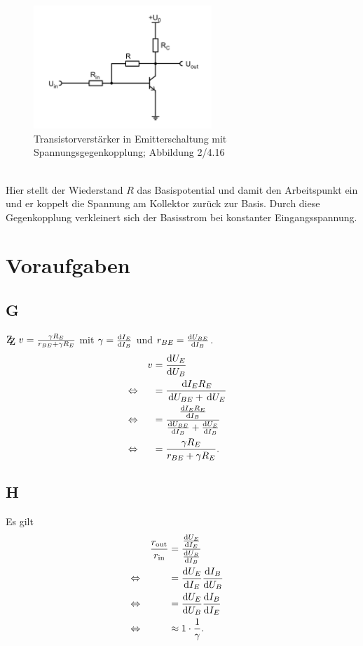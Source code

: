 \documentclass[a4paper,10pt]{article}
\newcommand{\td}{\,\text{d}}
\newcommand{\zz}{\mathrm{Z\kern-.3em\raise-0.5ex\hbox{Z} }}
\numberwithin{equation}{section}
\begin{document}
\begin{figure}[h]
        \centering
        \includegraphics[width=0.6\textwidth]{spannungsgegenkopplung.png}
        \caption{Transistorverstärker in Emitterschaltung mit Spannungsgegenkopplung; Abbildung 2/4.16 \cite{Praktikumsanleitung}}
        \vspace{100cm}
\end{figure}\\
Hier stellt der Wiederstand $R$ das Basispotential und damit den Arbeitspunkt ein und er koppelt die Spannung am Kollektor zurück zur Basis.
Durch diese Gegenkopplung verkleinert sich der Basisstrom bei konstanter Eingangsspannung.

\clearpage
\section{Voraufgaben}
\subsection{G}
$\zz\ v=\tfrac{\gamma R_E}{r_{BE}+\gamma R_E}$ mit $\gamma =\diff[]{I_E}{I_B}$ und $r_{BE}=\diff[]{U_{BE}}{I_B}$.
\begin{align} 
        && v &= \diff[]{U_E}{U_B} &&\\
        \Leftrightarrow && &= \dfrac{\td I_ER_E}{\td U_{BE}+\td U_E} &&\nonumber \\
        \Leftrightarrow && &= \dfrac{\diff[]{I_ER_E}{I_B}}{\diff[]{U_{BE}}{I_B}+\diff[]{U_E}{I_B}} &&\nonumber \\
        \Leftrightarrow && &= \dfrac{\gamma R_E}{r_{BE}+\gamma R_E}. &&
\end{align} 

\subsection{H}
Es gilt
\begin{align} 
        && \dfrac{r_\text{out}}{r_\text{in}} &= \dfrac{\diff[]{U_E}{I_E}}{\diff[]{U_B}{I_B}} &&\\
        \Leftrightarrow && &= \diff[]{U_E}{I_E}\diff[]{I_B}{U_B} &&\nonumber \\
        \Leftrightarrow && &= \diff[]{U_E}{U_B}\diff[]{I_B}{I_E} &&\nonumber \\
        \Leftrightarrow && &\approx 1\cdot \dfrac{1}{\gamma }. &&
\end{align} 
\end{document}
